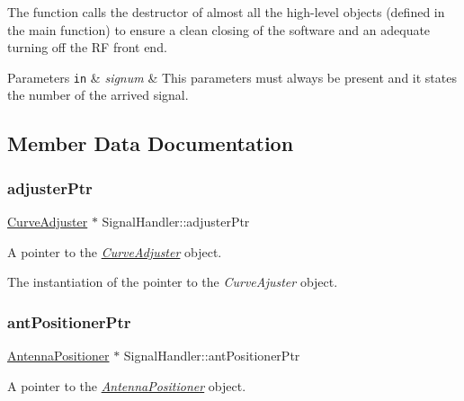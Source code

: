 The function calls the destructor of almost all the high-\/level objects (defined in the main function) to ensure a clean closing of the software and an adequate turning off the RF front end. 
\begin{DoxyParams}[1]{Parameters}
\mbox{\tt in}  & {\em signum} & This parameters must always be present and it states the number of the arrived signal. \\
\hline
\end{DoxyParams}


\subsection{Member Data Documentation}
\mbox{\label{classSignalHandler_ab3328bb82a0e67153d8ff39bf04c7196}} 
\subsubsection{\texorpdfstring{adjuster\+Ptr}{adjusterPtr}}
{\footnotesize\ttfamily \hyperlink{classCurveAdjuster}{Curve\+Adjuster} $\ast$ Signal\+Handler\+::adjuster\+Ptr\hspace{0.3cm}{\ttfamily [static]}}



A pointer to the {\itshape \hyperlink{classCurveAdjuster}{Curve\+Adjuster}} object. 

The instantiation of the pointer to the {\itshape Curve\+Ajuster} object. \mbox{\label{classSignalHandler_a04f82481d0f5795308e6e2cef7bb0f88}} 
\subsubsection{\texorpdfstring{ant\+Positioner\+Ptr}{antPositionerPtr}}
{\footnotesize\ttfamily \hyperlink{classAntennaPositioner}{Antenna\+Positioner} $\ast$ Signal\+Handler\+::ant\+Positioner\+Ptr\hspace{0.3cm}{\ttfamily [static]}}



A pointer to the {\itshape \hyperlink{classAntennaPositioner}{Antenna\+Positioner}} object. 

